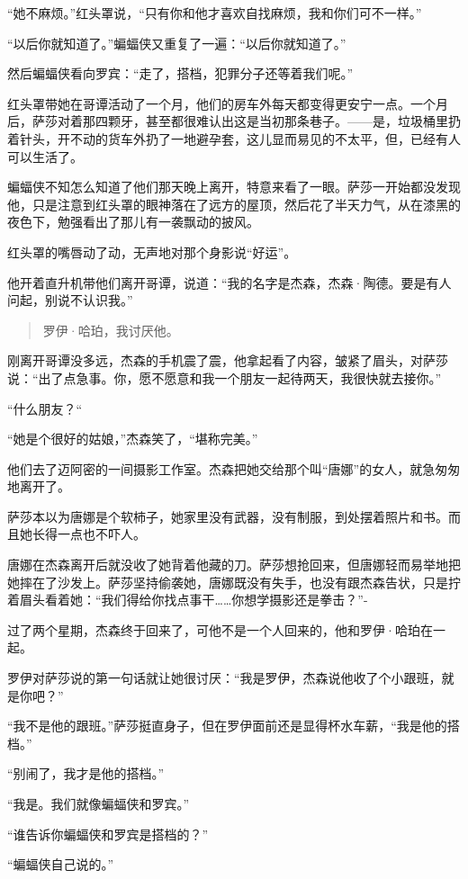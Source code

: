 \documentclass[../main]{subfiles}
\begin{document}
“她不麻烦。”红头罩说，“只有你和他才喜欢自找麻烦，我和你们可不一样。”

“以后你就知道了。”蝙蝠侠又重复了一遍：“以后你就知道了。”

然后蝙蝠侠看向罗宾：“走了，搭档，犯罪分子还等着我们呢。”

红头罩带她在哥谭活动了一个月，他们的房车外每天都变得更安宁一点。一个月后，萨莎对着那四颗牙，甚至都很难认出这是当初那条巷子。——是，垃圾桶里扔着针头，开不动的货车外扔了一地避孕套，这儿显而易见的不太平，但，已经有人可以生活了。

蝙蝠侠不知怎么知道了他们那天晚上离开，特意来看了一眼。萨莎一开始都没发现他，只是注意到红头罩的眼神落在了远方的屋顶，然后花了半天力气，从在漆黑的夜色下，勉强看出了那儿有一袭飘动的披风。

红头罩的嘴唇动了动，无声地对那个身影说“好运”。

他开着直升机带他们离开哥谭，说道：“我的名字是杰森，杰森·陶德。要是有人问起，别说不认识我。”

\begin{quote}
    罗伊·哈珀，我讨厌他。
\end{quote}

刚离开哥谭没多远，杰森的手机震了震，他拿起看了内容，皱紧了眉头，对萨莎说：“出了点急事。你，愿不愿意和我一个朋友一起待两天，我很快就去接你。”

“什么朋友？“

“她是个很好的姑娘，”杰森笑了，“堪称完美。”

他们去了迈阿密的一间摄影工作室。杰森把她交给那个叫“唐娜”的女人，就急匆匆地离开了。

萨莎本以为唐娜是个软柿子，她家里没有武器，没有制服，到处摆着照片和书。而且她长得一点也不吓人。

唐娜在杰森离开后就没收了她背着他藏的刀。萨莎想抢回来，但唐娜轻而易举地把她摔在了沙发上。萨莎坚持偷袭她，唐娜既没有失手，也没有跟杰森告状，只是拧着眉头看着她：“我们得给你找点事干……你想学摄影还是拳击？”-

过了两个星期，杰森终于回来了，可他不是一个人回来的，他和罗伊·哈珀在一起。

罗伊对萨莎说的第一句话就让她很讨厌：“我是罗伊，杰森说他收了个小跟班，就是你吧？”

“我不是他的跟班。”萨莎挺直身子，但在罗伊面前还是显得杯水车薪，“我是他的搭档。”

“别闹了，我才是他的搭档。”

“我是。我们就像蝙蝠侠和罗宾。”

“谁告诉你蝙蝠侠和罗宾是搭档的？”

“蝙蝠侠自己说的。”
\end{document}
